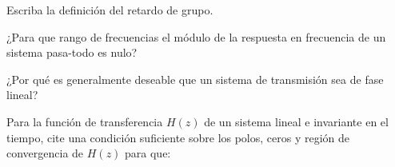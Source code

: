 \documentclass[addpoints]{exam}
\begin{document}
\begin{questions}

\newpage

\question[5]
Escriba la definición del retardo de grupo.


\question[5]
¿Para que rango de frecuencias el módulo de la respuesta en frecuencia de un sistema pasa-todo es nulo?


\question[5]
¿Por qué es generalmente deseable que un sistema de transmisión sea de fase lineal?


\newpage

\question[5]
Para la función de transferencia \(H(z)\) de un sistema lineal e invariante en el tiempo, cite una condición suficiente sobre los polos, ceros y región de convergencia de \(H(z)\) para que:

\end{questions}
\end{document}
